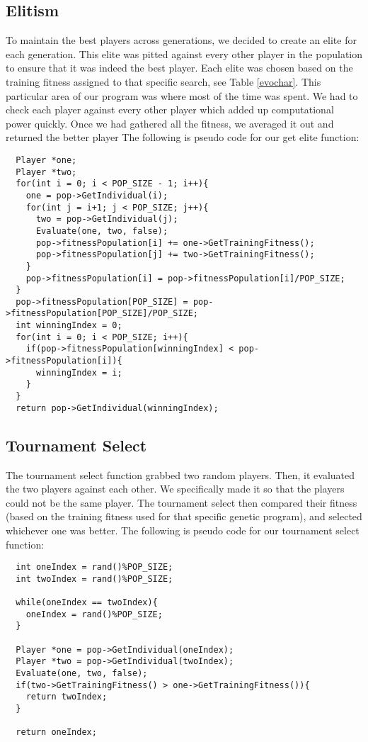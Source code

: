 \documentclass{acm_proc_article-sp}
\begin{document}
\subsection{Elitism}
To maintain the best players across generations, we decided to create an elite for each generation. This elite was pitted against every other player in the population to ensure that it was indeed the best player. Each elite was chosen based on the training fitness assigned to that specific search, see Table \ref{evochar}. This particular area of our program was where most of the time was spent. We had to check each player against every other player which added up computational power quickly. Once we had gathered all the fitness, we averaged it out and returned the better player The following is pseudo code for our get elite function:
\begin{verbatim}
  Player *one;
  Player *two;
  for(int i = 0; i < POP_SIZE - 1; i++){
    one = pop->GetIndividual(i);
    for(int j = i+1; j < POP_SIZE; j++){
      two = pop->GetIndividual(j);
      Evaluate(one, two, false);
      pop->fitnessPopulation[i] += one->GetTrainingFitness();
      pop->fitnessPopulation[j] += two->GetTrainingFitness();
    }
    pop->fitnessPopulation[i] = pop->fitnessPopulation[i]/POP_SIZE;
  }
  pop->fitnessPopulation[POP_SIZE] = pop->fitnessPopulation[POP_SIZE]/POP_SIZE;
  int winningIndex = 0;
  for(int i = 0; i < POP_SIZE; i++){
    if(pop->fitnessPopulation[winningIndex] < pop->fitnessPopulation[i]){
      winningIndex = i;
    }
  }
  return pop->GetIndividual(winningIndex);
\end{verbatim}

\subsection{Tournament Select}
The tournament select function grabbed two random players. Then, it evaluated the two players against each other. We specifically made it so that the players could not be the same player. The tournament select then compared their fitness (based on the training fitness used for that specific genetic program), and selected whichever one was better. The following is pseudo code for our tournament select function:
\begin{verbatim}
  int oneIndex = rand()%POP_SIZE;
  int twoIndex = rand()%POP_SIZE;

  while(oneIndex == twoIndex){
    oneIndex = rand()%POP_SIZE;
  }

  Player *one = pop->GetIndividual(oneIndex);
  Player *two = pop->GetIndividual(twoIndex);
  Evaluate(one, two, false);
  if(two->GetTrainingFitness() > one->GetTrainingFitness()){
    return twoIndex;
  }

  return oneIndex;
\end{verbatim}
\end{document}
